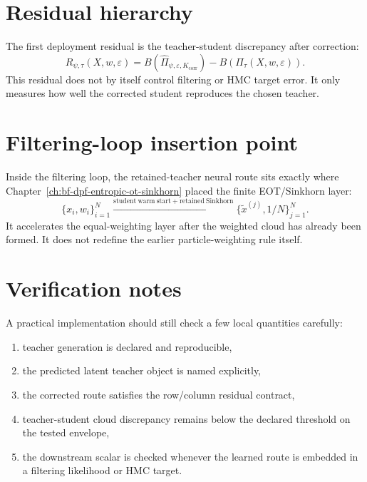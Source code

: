 \section{Residual hierarchy}
\label{sec:bf-learned-ot-residuals}

The first deployment residual is the teacher-student discrepancy after correction:
\begin{equation}
\label{eq:bf-learned-ot-residual}
  R_{\psi,\tau}(X,w,\varepsilon)
  =
  B(\widehat\Pi_{\psi,\varepsilon,K_{\mathrm{corr}}})
  -
  B(\Pi_\tau(X,w,\varepsilon)).
\end{equation}
This residual does not by itself control filtering or HMC target error.  It only
measures how well the corrected student reproduces the chosen teacher.

\section{Filtering-loop insertion point}
\label{sec:bf-learned-ot-loop}

Inside the filtering loop, the retained-teacher neural route sits exactly where
Chapter~\ref{ch:bf-dpf-entropic-ot-sinkhorn} placed the finite EOT/Sinkhorn
layer:
\begin{equation}
\label{eq:bf-learned-ot-loop}
  \{x_i,w_i\}_{i=1}^N
  \xrightarrow{\mathrm{student\ warm\ start + retained\ Sinkhorn}}
  \{\tilde x^{(j)},1/N\}_{j=1}^N.
\end{equation}
It accelerates the equal-weighting layer after the weighted cloud has already been
formed.  It does not redefine the earlier particle-weighting rule itself.

\section{Verification notes}
\label{sec:bf-learned-ot-verification}

A practical implementation should still check a few local quantities carefully:
\begin{enumerate}[label=(\arabic*)]
  \item teacher generation is declared and reproducible,
  \item the predicted latent teacher object is named explicitly,
  \item the corrected route satisfies the row/column residual contract,
  \item teacher-student cloud discrepancy remains below the declared threshold on
  the tested envelope,
  \item the downstream scalar is checked whenever the learned route is embedded in
  a filtering likelihood or HMC target.
\end{enumerate}

